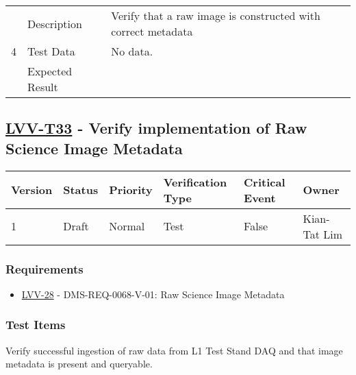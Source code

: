 \begin{longtable}[]{p{1.3cm}p{2cm}p{13cm}}
            \multirow{3}{*}{ 4 } & Description &
            \begin{minipage}[t]{13cm}{\footnotesize
            Verify that a raw image is constructed with correct metadata

            \vspace{\dp0}
            } \end{minipage} \\ \cline{2-3}
            & Test Data &
            \begin{minipage}[t]{13cm}{\footnotesize
                No data.
                \vspace{\dp0}
            } \end{minipage} \\ \cline{2-3}
            & Expected Result &
        \\ \midrule
    \end{longtable}

\subsection{\href{https://jira.lsstcorp.org/secure/Tests.jspa\#/testCase/LVV-T33}{LVV-T33}
    - Verify implementation of Raw Science Image Metadata}\label{lvv-t33}

\begin{longtable}[]{llllll}
\toprule
Version & Status & Priority & Verification Type & Critical Event & Owner
\\\midrule
1 & Draft & Normal &
Test & False & Kian-Tat Lim
\\\bottomrule
\end{longtable}

\subsubsection{Requirements}
\begin{itemize}
\item \href{https://jira.lsstcorp.org/browse/LVV-28}{LVV-28} - DMS-REQ-0068-V-01: Raw Science Image Metadata
\end{itemize}

\subsubsection{Test Items}
Verify successful ingestion of raw data from L1 Test Stand DAQ and that
image metadata is present and queryable.



